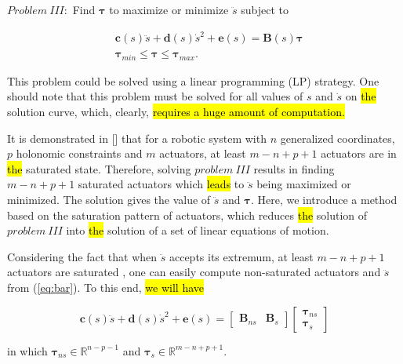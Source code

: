 \documentclass{rob}%
\begin{document}
\medskip
$ Problem \ III: $ Find $ \boldsymbol \tau $ to maximize or minimize $ \ddot s $ subject to

\begin{equation}
\label{eq:P3}
\begin{aligned}
&{\boldsymbol c}(s)\ddot s+{\boldsymbol d}(s)\dot s^2+{\boldsymbol e}(s)={\mathbf B}(s)\boldsymbol \tau \\
&\boldsymbol \tau_{min}\leq \boldsymbol \tau \leq  \boldsymbol \tau_{max}.
\end{aligned}
\end{equation}

This problem could be solved using a linear programming (LP) strategy. One should note that this problem must be solved for all values of $ s $ and $ \dot s $ on \hl{the} solution curve, which, clearly, \hl{requires a huge amount of computation.}

It is demonstrated in [] that for a robotic system with $ n $ generalized coordinates, $ p $ holonomic constraints and $ m $ actuators, at least $ m-n+p+1 $ actuators are in \hl{the} saturated state. 
Therefore, solving $ problem \ III $ results in finding $ m-n+p+1 $ saturated actuators which \hl{leads} to $ \ddot s $ being maximized or minimized. The solution gives the value of $ \ddot s $ and $ \boldsymbol \tau $.  
Here, we introduce a method based on the saturation pattern of actuators, which reduces \hl{the} solution of $ problem \ III $ into \hl{the} solution of a set of linear equations of motion.

Considering the fact that when $ \ddot s $ accepts its extremum, at least $ m-n+p+1 $ actuators are saturated \cite{McCarthy1992}, one can easily compute non-saturated actuators and $ \ddot s $ from (\ref{eq:bar}). To this end, \hl{we will have}

\begin{equation}
\label{eq:E4}
{\boldsymbol c}(s)\ddot s+{\boldsymbol d}(s)\dot s^2+{\boldsymbol e}(s)=
\begin{bmatrix} {\mathbf B}_{ns} & {\mathbf B}_{s} \end{bmatrix}
\begin{bmatrix} \boldsymbol{\tau}_{ns} \\ \boldsymbol{\tau}_{s} \end{bmatrix}         
\end{equation}

\noindent
in which $ \boldsymbol \tau_{ns}\in \mathbb{R}^{n-p-1} $ and $ \boldsymbol \tau_{s}\in \mathbb{R}^{m-n+p+1} $.
\end{document}
